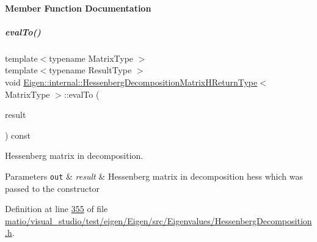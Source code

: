 \paragraph{Member Function Documentation}
\mbox{\label{group___eigenvalues___module_a7f1d84113072d2d2e507d3821ff9f15c}} 
\subparagraph{\texorpdfstring{eval\+To()}{evalTo()}\hspace{0.1cm}{\footnotesize\ttfamily [1/2]}}
{\footnotesize\ttfamily template$<$typename Matrix\+Type $>$ \\
template$<$typename Result\+Type $>$ \\
void \hyperlink{group___eigenvalues___module_struct_eigen_1_1internal_1_1_hessenberg_decomposition_matrix_h_return_type}{Eigen\+::internal\+::\+Hessenberg\+Decomposition\+Matrix\+H\+Return\+Type}$<$ Matrix\+Type $>$\+::eval\+To (\begin{DoxyParamCaption}\item[{Result\+Type \&}]{result }\end{DoxyParamCaption}) const\hspace{0.3cm}{\ttfamily [inline]}}



Hessenberg matrix in decomposition. 


\begin{DoxyParams}[1]{Parameters}
\mbox{\tt out}  & {\em result} & Hessenberg matrix in decomposition {\ttfamily hess} which was passed to the constructor \\
\hline
\end{DoxyParams}


Definition at line \hyperlink{matio_2visual__studio_2test_2eigen_2_eigen_2src_2_eigenvalues_2_hessenberg_decomposition_8h_source_l00355}{355} of file \hyperlink{matio_2visual__studio_2test_2eigen_2_eigen_2src_2_eigenvalues_2_hessenberg_decomposition_8h_source}{matio/visual\+\_\+studio/test/eigen/\+Eigen/src/\+Eigenvalues/\+Hessenberg\+Decomposition.\+h}.

